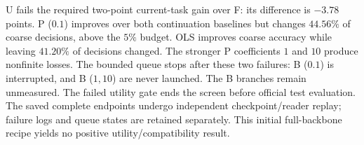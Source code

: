 U fails the required two-point current-task gain over F: its difference is
$-3.78$ points. P ($0.1$) improves over both continuation baselines but changes
$44.56\%$ of coarse decisions, above the $5\%$ budget. OLS improves coarse
accuracy while leaving $41.20\%$ of decisions changed. The stronger P
coefficients $1$ and $10$ produce nonfinite losses. The bounded queue stops
after these two failures: B ($0.1$) is interrupted, and B ($1,10$) are never
launched. The B branches remain unmeasured. The failed utility gate ends the screen
before official test evaluation. The saved complete
endpoints undergo independent checkpoint/reader replay; failure logs and queue
states are retained separately. This initial full-backbone recipe yields no positive utility/compatibility result.
